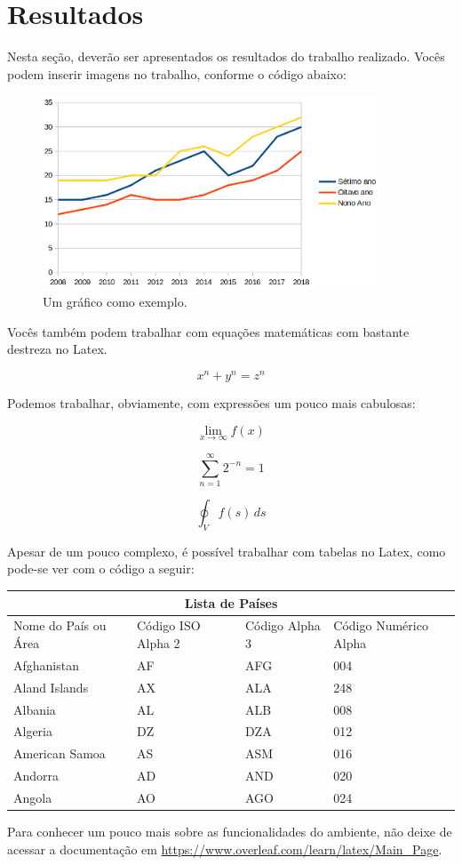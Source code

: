 \section{Resultados}

Nesta seção, deverão ser apresentados os resultados do trabalho realizado. Vocês podem inserir imagens no trabalho, conforme o código abaixo:

\begin{figure}[htp]
    \centering
    \includegraphics[width=10cm]{imagens/grafico.jpg}
    \caption{Um gráfico como exemplo.}
    \label{fig:galaxy}
\end{figure}

Vocês também podem trabalhar com equações matemáticas com bastante destreza no Latex.

\[ x^n + y^n = z^n \]

Podemos trabalhar, obviamente, com expressões um pouco mais cabulosas:

$$\lim_{x\to\infty} f(x)$$

$$\sum_{n=1}^{\infty} 2^{-n} = 1$$	

$$\oint_V f(s) \,ds$$

Apesar de um pouco complexo, é possível trabalhar com tabelas no Latex, como pode-se ver com o código a seguir:

\begin{tabular}{ |p{3cm}||p{3cm}|p{3cm}|p{3cm}|  }
 \hline
 \multicolumn{4}{|c|}{Lista de Países} \\
 \hline
 Nome do País ou Área& Código ISO Alpha 2 & Código Alpha 3& Código Numérico Alpha\\
 \hline
 Afghanistan   & AF    &AFG&   004\\
 Aland Islands&   AX  & ALA   &248\\
 Albania &AL & ALB&  008\\
 Algeria    &DZ & DZA&  012\\
 American Samoa&   AS  & ASM&016\\
 Andorra& AD  & AND   &020\\
 Angola& AO  & AGO&024\\
 \hline
\end{tabular}

Para conhecer um pouco mais sobre as funcionalidades do ambiente, não deixe de acessar a documentação em \url{https://www.overleaf.com/learn/latex/Main_Page}.
